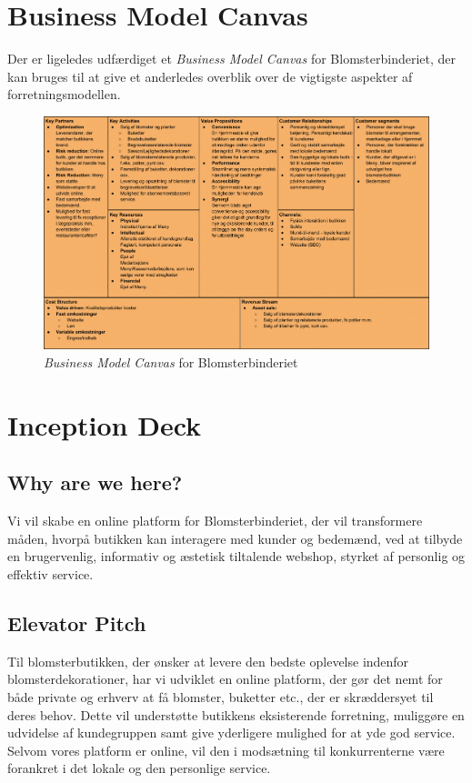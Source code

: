 \section{Business Model Canvas}
Der er ligeledes udfærdiget et \emph{Business Model Canvas} for Blomsterbinderiet, der kan bruges til at give et anderledes overblik over de vigtigste aspekter af forretningsmodellen.
\begin{figure}[H]
    \centering
    \includegraphics[width=1\textwidth]{figures/business/bmc1.png}
    \caption{\emph{Business Model Canvas} for Blomsterbinderiet}
    \label{fig:bmc1}
\end{figure}

\section{Inception Deck}

\subsection{Why are we here?}
Vi vil skabe en online platform for Blomsterbinderiet, der vil transformere måden, 
hvorpå butikken kan interagere med kunder og bedemænd, ved at tilbyde en brugervenlig, 
informativ og æstetisk tiltalende webshop, styrket af personlig og effektiv service.

\subsection{Elevator Pitch}
Til blomsterbutikken, der ønsker at levere den bedste oplevelse indenfor blomsterdekorationer, 
har vi udviklet en online platform, der gør det nemt for både private og erhverv at få blomster, buketter etc., der er skræddersyet til deres behov.
Dette vil understøtte butikkens eksisterende forretning, muliggøre en udvidelse af kundegruppen samt give yderligere mulighed for at yde god service.
Selvom vores platform er online, vil den i modsætning til konkurrenterne være forankret i det lokale og den personlige service.

